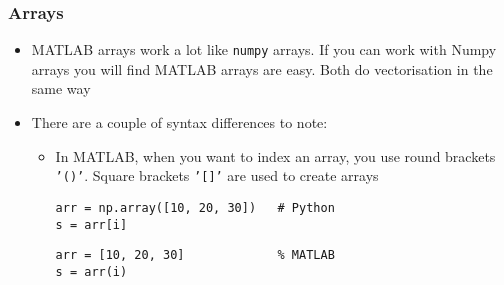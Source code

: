 \documentclass[english,14pt]{beamer}
\begin{document}

\begin{frame}[fragile]

\frametitle{Arrays}

\begin{itemize}
	\item MATLAB arrays work a lot like \texttt{numpy} arrays. If you can work with Numpy arrays you will find MATLAB arrays are easy. Both do vectorisation in the same way
	\item There are a couple of syntax differences to note:
	\begin{itemize}
		\item In MATLAB, when you want to index an array, you use round brackets \texttt{'()'}. Square brackets \texttt{'[]'} are used to create arrays
\begin{lstlisting}[style=CStyle]
arr = np.array([10, 20, 30])   # Python
s = arr[i]
\end{lstlisting}
\begin{lstlisting}[style=MStyle]
arr = [10, 20, 30]             % MATLAB
s = arr(i)
\end{lstlisting}
    \end{itemize}
\end{itemize}

\end{frame}

\end{document}
